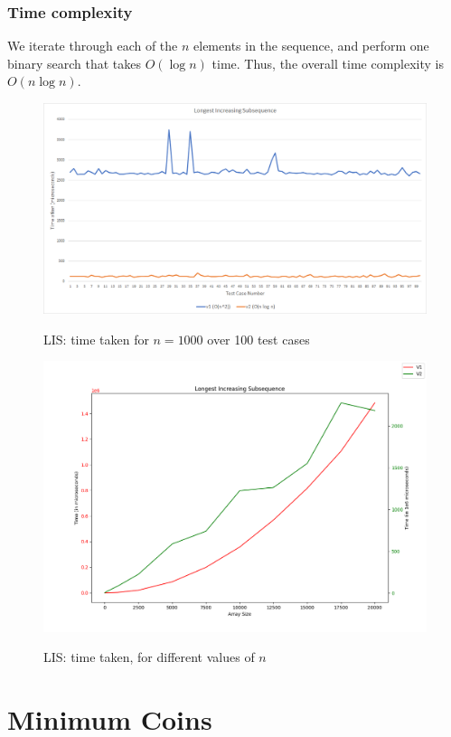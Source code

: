 \documentclass[12pt, a4paper]{article}
\theoremstyle{definition}
\theoremstyle{remark}
\begin{document}
\subsubsection{Time complexity}
We iterate through each of the $n$ elements in the sequence, and perform one binary search that takes $O(\log n)$ time. Thus, the overall time complexity is $O(n \log n)$.

\begin{figure}[!h]
    \centering
    \includegraphics[scale=0.5]{img/LIS - constant n (1000).png}
    \label{fig:LIS1}
    \caption{LIS: time taken for $n = 1000$ over 100 test cases}
\end{figure}
\begin{figure}[!h]
    \centering
    \includegraphics[scale=0.52]{img/LIS - multiple n values.png
    }
    \label{fig:LIS2}
    \caption{LIS: time taken, for different values of $n$}
\end{figure}

\section{Minimum Coins}
\end{document}
